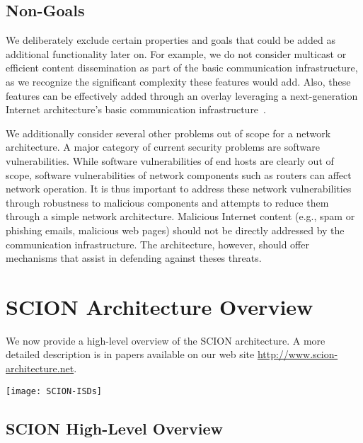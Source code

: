 \documentclass[a4paper]{llncs}
\newcommand\SCION{{\small\textsf{SCION}}\xspace}
\renewcommand\H{\textsf{H}\xspace}
\begin{document}
\subsection{Non-Goals}

We deliberately exclude certain properties and goals
that could be added as additional functionality later on. For example, we do not consider
multicast or efficient content dissemination as part of the basic
communication infrastructure, as we recognize the significant
complexity these features would add. Also, these features can be effectively
added through an overlay leveraging a next-generation Internet architecture's
basic communication infrastructure~\cite{FLTGKMNSS2013}.

\medskip
We additionally consider several other problems out of scope for a network
architecture.
A major category of current security problems are software
vulnerabilities. While software vulnerabilities of end hosts are
clearly out of scope, software vulnerabilities of network components such as
routers can
affect network operation. It is thus important to address these
network vulnerabilities through robustness to malicious components
and attempts to reduce them through a simple network architecture.
Malicious Internet content (e.g., spam or phishing emails, malicious
web pages) should not be directly addressed by the communication infrastructure.
The architecture, however, should offer mechanisms that assist in
defending against theses threats.

 

\section{SCION Architecture Overview}

We now provide a high-level overview of the \SCION architecture. A more detailed
description is in papers available on our web site \url{http://www.scion-architecture.net}.

\begin{figure*}[tp]
  \centering
  \texttt{[image: SCION-ISDs]}
  \caption{Four\,\SCION ISDs with ISD Cores and ASes. The ISD Core
  ASes are connected via Core paths. Non-Core ASes are connected via
  customer-to-provider or peering links. AS \H is contained in two
  ISDs.}
  \label{fig:ISDs}
\end{figure*}

\subsection{SCION High-Level Overview}
\end{document}
